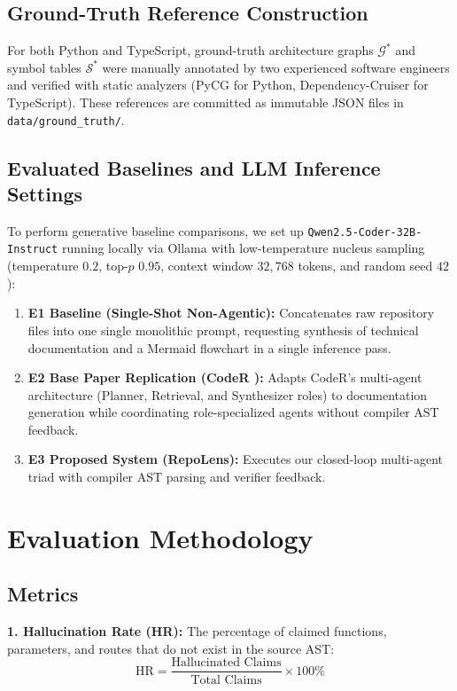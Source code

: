 \documentclass[conference]{IEEEtran}
\begin{document}
\subsection{Ground-Truth Reference Construction}
For both Python and TypeScript, ground-truth architecture graphs $\mathcal{G}^*$ and symbol tables $\mathcal{S}^*$ were manually annotated by two experienced software engineers and verified with static analyzers (PyCG for Python, Dependency-Cruiser for TypeScript). These references are committed as immutable JSON files in \texttt{data/ground\_truth/}.

\subsection{Evaluated Baselines and LLM Inference Settings}
To perform generative baseline comparisons, we set up \texttt{Qwen2.5-Coder-32B-Instruct} running locally via Ollama with low-temperature nucleus sampling (temperature $0.2$, top-$p$ $0.95$, context window $32{,}768$ tokens, and random seed $42$):
\begin{enumerate}
    \item \textbf{E1 Baseline (Single-Shot Non-Agentic):} Concatenates raw repository files into one single monolithic prompt, requesting synthesis of technical documentation and a Mermaid flowchart in a single inference pass.
    \item \textbf{E2 Base Paper Replication (CodeR \cite{coder2025}):} Adapts CodeR's multi-agent architecture (Planner, Retrieval, and Synthesizer roles) to documentation generation while coordinating role-specialized agents without compiler AST feedback.
    \item \textbf{E3 Proposed System (RepoLens):} Executes our closed-loop multi-agent triad with compiler AST parsing and verifier feedback.
\end{enumerate}

\section{Evaluation Methodology}

\subsection{Metrics}
\textbf{1. Hallucination Rate (HR):} The percentage of claimed functions, parameters, and routes that do not exist in the source AST:
\begin{equation}
\text{HR} = \frac{\text{Hallucinated Claims}}{\text{Total Claims}} \times 100\%
\end{equation}
\end{document}
